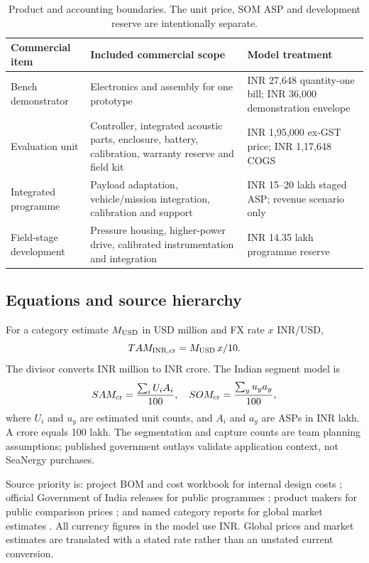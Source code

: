 \documentclass[11pt,a4paper]{article}
\begin{document}
\begin{table}[htbp]\centering
\begin{tabularx}{\textwidth}{@{}p{}YY@{}}
\toprule
Commercial item & Included commercial scope & Model treatment\\ \midrule
Bench demonstrator & Electronics and assembly for one prototype & INR 27,648 quantity-one bill; INR 36,000 demonstration envelope\\
Evaluation unit & Controller, integrated acoustic parts, enclosure, battery, calibration, warranty reserve and field kit & INR 1,95,000 ex-GST price; INR 1,17,648 COGS\\
Integrated programme & Payload adaptation, vehicle/mission integration, calibration and support & INR 15--20 lakh staged ASP; revenue scenario only\\
Field-stage development & Pressure housing, higher-power drive, calibrated instrumentation and integration & INR 14.35 lakh programme reserve\\ \bottomrule
\end{tabularx}
\caption{Product and accounting boundaries. The unit price, SOM ASP and development reserve are intentionally separate.}
\label{tab:tiers}
\end{table}

\subsection{Equations and source hierarchy}
For a category estimate $M_{\rm USD}$ in USD million and FX rate $x$ INR/USD,
\begin{equation}
TAM_{\rm INR,cr}=M_{\rm USD}\,x/10.
\label{eq:tam}
\end{equation}
The divisor converts INR million to INR crore. The Indian segment model is
\begin{equation}
SAM_{\rm cr}=\frac{\sum_i U_i A_i}{100},
\quad
SOM_{\rm cr}=\frac{\sum_y u_y a_y}{100},
\label{eq:sam}
\end{equation}
where $U_i$ and $u_y$ are estimated unit counts, and $A_i$ and $a_y$ are ASPs in INR lakh. A crore equals 100 lakh. The segmentation and capture counts are team planning assumptions; published government outlays validate application context, not SeaNergy purchases.

Source priority is: project BOM and cost workbook for internal design costs \cite{bom,workbook}; official Government of India releases for public programmes \cite{dom,aditi,sagarmala}; product makers for public comparison prices \cite{ping,echo}; and named category reports for global market estimates \cite{diresearch,gir}. All currency figures in the model use INR. Global prices and market estimates are translated with a stated rate rather than an unstated current conversion.
\end{document}
